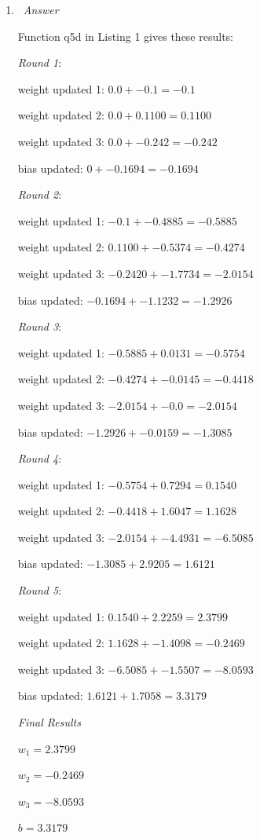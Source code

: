 \documentclass[12pt, fullpage,letterpaper]{article}
\begin{document}
\begin{enumerate}
\begin{enumerate}
	\item~\emph{Answer}
	
	Function q5d in Listing 1 gives these results:
	
	\emph{Round 1}:
	
	weight updated 1: $0.0 + -0.1 = -0.1$
	
	weight updated 2: $0.0 + 0.1100 = 0.1100$
    
    weight updated 3: $0.0 + -0.242 = -0.242$
    
    bias updated: $0 + -0.1694 = -0.1694$
    
    \emph{Round 2}:
    
    weight updated 1: $-0.1 + -0.4885 = -0.5885$
    
    weight updated 2: $0.1100 + -0.5374 = -0.4274$
    
    weight updated 3: $-0.2420 + -1.7734 = -2.0154$
    
    bias updated: $-0.1694 + -1.1232 = -1.2926$
    
    \emph{Round 3}:
    
    weight updated 1: $-0.5885 + 0.0131 = -0.5754$
    
    weight updated 2: $-0.4274 + -0.0145 = -0.4418$
    
    weight updated 3: $-2.0154 + -0.0 = -2.0154$
    
    bias updated: $-1.2926 + -0.0159 = -1.3085$
    
    \emph{Round 4}:
    
    weight updated 1: $-0.5754 + 0.7294 = 0.1540$
    
    weight updated 2: $-0.4418 + 1.6047 = 1.1628$
    
    weight updated 3: $-2.0154 + -4.4931 = -6.5085$
    
    bias updated: $-1.3085 + 2.9205 = 1.6121$
    
    \emph{Round 5}:
    
    weight updated 1: $0.1540 + 2.2259 = 2.3799$
    
    weight updated 2: $1.1628 + -1.4098 = -0.2469$
    
    weight updated 3: $-6.5085 + -1.5507 = -8.0593$
    
    bias updated: $1.6121 + 1.7058 = 3.3179$
    
    \emph{Final Results}
    
    $w_1 = 2.3799$
    
    $w_2 = -0.2469$
    
    $w_3 = -8.0593$
    
    $b = 3.3179$
	
\end{enumerate}
\end{enumerate}
\end{document}

